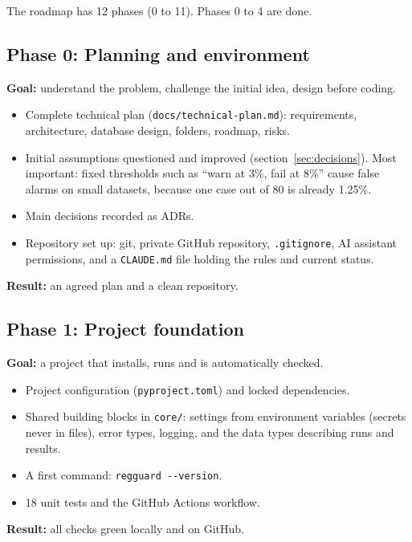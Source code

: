 \documentclass[11pt,a4paper]{article}
\newcommand{\code}[1]{\nolinkurl{#1}}
\begin{document}
The roadmap has 12 phases (0 to 11). Phases 0 to 4 are done.

\subsection{Phase 0: Planning and environment}
\textbf{Goal:} understand the problem, challenge the initial idea, design before coding.
\begin{itemize}
  \item Complete technical plan (\code{docs/technical-plan.md}): requirements, architecture,
        database design, folders, roadmap, risks.
  \item Initial assumptions questioned and improved (section~\ref{sec:decisions}). Most
        important: fixed thresholds such as ``warn at 3\%, fail at 8\%'' cause false alarms on
        small datasets, because one case out of 80 is already 1.25\%.
  \item Main decisions recorded as ADRs.
  \item Repository set up: git, private GitHub repository, \code{.gitignore}, AI assistant
        permissions, and a \code{CLAUDE.md} file holding the rules and current status.
\end{itemize}
\textbf{Result:} an agreed plan and a clean repository.

\subsection{Phase 1: Project foundation}
\textbf{Goal:} a project that installs, runs and is automatically checked.
\begin{itemize}
  \item Project configuration (\code{pyproject.toml}) and locked dependencies.
  \item Shared building blocks in \code{core/}: settings from environment variables (secrets
        never in files), error types, logging, and the data types describing runs and results.
  \item A first command: \texttt{regguard -{}-version}.
  \item 18 unit tests and the GitHub Actions workflow.
\end{itemize}
\textbf{Result:} all checks green locally and on GitHub.
\end{document}
